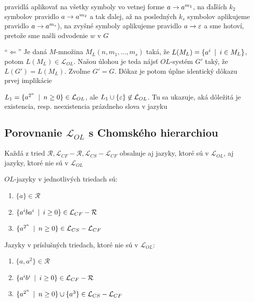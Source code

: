 \begin{dokaz}
\begin{description}
\begin{description}
{          pravidlá aplikovať na všetky symboly vo vetnej forme} $a\rightarrow
          a^{m_{1}}$, na ďaľších $k_{2}$ symbolov pravidlo $a\rightarrow a^{m_{2}}$
          a tak ďalej, až na posledných $k_{s}$ symbolov aplikujeme pravidlo
          $a\rightarrow a^{m_{s}}$), na zvyšné symboly aplikujeme pravidlo
          $a\rightarrow\varepsilon$ a sme hotoví, pretože sme našli odvodenie $w$ v
          $G$
      \end{description}
    \item{``$\Leftarrow$''} Je daná $M$-množina
      $M_{L}(n,m_{1},\dots,m_{s})$ taká, že $L(M_{L})=\{a^{i}\enspace |\enspace i\in
      M_{L}\}$, potom $L(M_{L})\in\mathcal{L}_{OL}$. Našou úlohou je
      teda nájsť $OL$-systém $G'$ taký, že $L(G')=L(M_{L})$. Zvoľme
      $G'=G$. Dôkaz je potom úplne identický dôkazu prvej implikácie
  \end{description}
\end{dokaz}

\begin{poznamka}
  $L_{1}=\{a^{2^{n}}\enspace |\enspace n\geq0\}\in\mathcal{L}_{OL}$, ale
  $L_{1}\cup\{\varepsilon\}\not\in\mathcal{L}_{OL}$. Tu sa ukazuje,
  aká dôležitá je existencia, resp. neexistencia prázdneho slova v
  jazyku
\end{poznamka}

\subsection{Porovnanie $\mathcal{L}_{OL}$ s Chomského hierarchiou}

\begin{veta}
  Každá z tried $\mathcal{R},\mathcal{L}_{CF} - \mathcal{R},
  \mathcal{L}_{CS} - \mathcal{L}_{CF}$ obsahuje aj jazyky, ktoré sú
  v $\mathcal{L}_{OL}$, aj jazyky, ktoré nie sú v $\mathcal{L}_{OL}$
\end{veta}

\begin{dokaz}
  $OL$-jazyky v jednotlivých triedach sú:

  \begin{enumerate}
    \item $\{a\}\in\mathcal{R}$
    \item $\{a^{i}ba^{i}\enspace |\enspace i\geq0\}\in\mathcal{L}_{CF} - \mathcal{R}$
    \item $\{a^{2^{n}}\enspace |\enspace n\geq0\}\in\mathcal{L}_{CS} - \mathcal{L}_{CF}$
  \end{enumerate}

  Jazyky v príslušných triedach, ktoré nie sú v $\mathcal{L}_{OL}$:

  \begin{enumerate}
    \item $\{a,a^{2}\}\in\mathcal{R}$
    \item $\{a^{i}b^{i}\enspace |\enspace i\geq0\}\in\mathcal{L}_{CF} - \mathcal{R}$
    \item $\{a^{2^{n}}\enspace |\enspace n\geq0\}\cup\{a^{3}\}\in\mathcal{L}_{CS}
      - \mathcal{L}_{CF}$
  \end{enumerate}
\end{dokaz}

